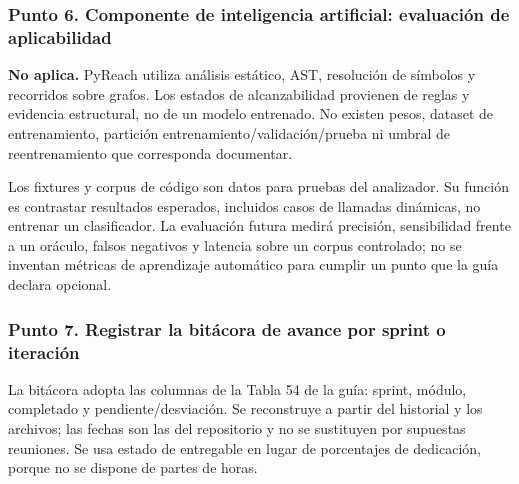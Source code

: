 \subsubsection{Punto 6. Componente de inteligencia artificial: evaluación de aplicabilidad}
\textbf{No aplica.} PyReach utiliza análisis estático, AST, resolución de símbolos y recorridos sobre grafos. Los estados de alcanzabilidad provienen de reglas y evidencia estructural, no de un modelo entrenado. No existen pesos, dataset de entrenamiento, partición entrenamiento/validación/prueba ni umbral de reentrenamiento que corresponda documentar.

Los fixtures y corpus de código son datos para pruebas del analizador. Su función es contrastar resultados esperados, incluidos casos de llamadas dinámicas, no entrenar un clasificador. La evaluación futura medirá precisión, sensibilidad frente a un oráculo, falsos negativos y latencia sobre un corpus controlado; no se inventan métricas de aprendizaje automático para cumplir un punto que la guía declara opcional.

\subsubsection{Punto 7. Registrar la bitácora de avance por sprint o iteración}
La bitácora adopta las columnas de la Tabla 54 de la guía: sprint, módulo, completado y pendiente/desviación. Se reconstruye a partir del historial y los archivos; las fechas son las del repositorio y no se sustituyen por supuestas reuniones. Se usa estado de entregable en lugar de porcentajes de dedicación, porque no se dispone de partes de horas.

